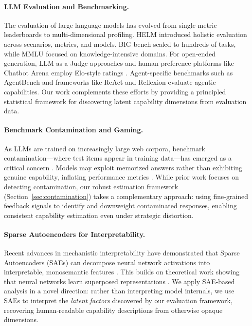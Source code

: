 \documentclass{article}
\theoremstyle{plain}
\theoremstyle{definition}
\theoremstyle{remark}
\begin{document}
\paragraph{LLM Evaluation and Benchmarking.}
The evaluation of large language models has evolved from single-metric leaderboards to multi-dimensional profiling. HELM \cite{liang2022holistic} introduced holistic evaluation across scenarios, metrics, and models. BIG-bench \cite{srivastava2022beyond} scaled to hundreds of tasks, while MMLU \cite{hendrycks2021measuring} focused on knowledge-intensive domains. For open-ended generation, LLM-as-a-Judge approaches \cite{zheng2023judging} and human preference platforms like Chatbot Arena \cite{chiang2024chatbot} employ Elo-style ratings \cite{elo1978rating}. Agent-specific benchmarks such as AgentBench \cite{liu2023agentbench} and frameworks like ReAct \cite{yao2023react} and Reflexion \cite{shinn2023reflexion} evaluate agentic capabilities. Our work complements these efforts by providing a principled statistical framework for discovering latent capability dimensions from evaluation data.

\paragraph{Benchmark Contamination and Gaming.}
As LLMs are trained on increasingly large web corpora, benchmark contamination---where test items appear in training data---has emerged as a critical concern \cite{sainz2023nlp, oren2024proving, zhou2023dont}. Models may exploit memorized answers rather than exhibiting genuine capability, inflating performance metrics \cite{jacovi2023stop}. While prior work focuses on detecting contamination, our robust estimation framework (Section~\ref{sec:contamination}) takes a complementary approach: using fine-grained feedback signals to identify and downweight contaminated responses, enabling consistent capability estimation even under strategic distortion.

\paragraph{Sparse Autoencoders for Interpretability.}
Recent advances in mechanistic interpretability have demonstrated that Sparse Autoencoders (SAEs) can decompose neural network activations into interpretable, monosemantic features \cite{bricken2023monosemanticity, cunningham2023sparse}. This builds on theoretical work showing that neural networks learn superposed representations \cite{elhage2022toy}. We apply SAE-based analysis in a novel direction: rather than interpreting model internals, we use SAEs to interpret the \textit{latent factors} discovered by our evaluation framework, recovering human-readable capability descriptions from otherwise opaque dimensions.
\end{document}
